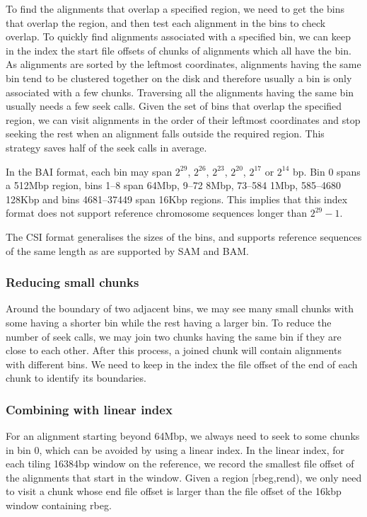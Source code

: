 \documentclass[10pt]{article}
\begin{document}

To find the alignments that overlap a specified region, we need to get
the bins that overlap the region, and then test each alignment in the
bins to check overlap. To quickly find alignments associated with a
specified bin, we can keep in the index the start file offsets of chunks
of alignments which all have the bin. As alignments are sorted by the
leftmost coordinates, alignments having the same bin tend to be
clustered together on the disk and therefore usually a bin is only
associated with a few chunks. Traversing all the alignments having the
same bin usually needs a few seek calls. Given the set of bins that
overlap the specified region, we can visit alignments in the order of
their leftmost coordinates and stop seeking the rest when an alignment
falls outside the required region. This strategy saves half of the seek
calls in average.

In the BAI format, each bin may span $2^{29}$, $2^{26}$, $2^{23}$, $2^{20}$,
$2^{17}$ or $2^{14}$ bp. Bin 0 spans a 512Mbp region, bins 1--8 span 64Mbp,
9--72 8Mbp, 73--584 1Mbp, 585--4680 128Kbp and bins 4681--37449 span 16Kbp
regions.  This implies that this index format does not support reference
chromosome sequences longer than $2^{29}-1$.

The CSI format generalises the sizes of the bins, and supports reference
sequences of the same length as are supported by SAM and BAM.

\subsubsection{Reducing small chunks}
Around the boundary of two adjacent bins, we may see many small chunks
with some having a shorter bin while the rest having a larger bin. To
reduce the number of seek calls, we may join two chunks having the same
bin if they are close to each other. After this process, a joined chunk
will contain alignments with different bins. We need to keep in the
index the file offset of the end of each chunk to identify its
boundaries.

\subsubsection{Combining with linear index}
For an alignment starting beyond 64Mbp, we always need to seek to some
chunks in bin 0, which can be avoided by using a linear index. In the
linear index, for each tiling 16384bp window on the reference, we record
the smallest file offset of the alignments that start in the
window. Given a region [rbeg,rend), we only need to visit a chunk whose
end file offset is larger than the file offset of the 16kbp window
containing rbeg.
\end{document}
